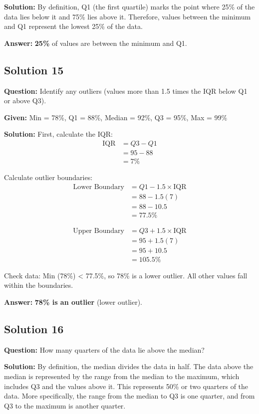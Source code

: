 \documentclass[12pt,a4paper]{article}
\begin{document}
\textbf{Solution:} By definition, Q1 (the first quartile) marks the point where 25\% of the data lies below it and 75\% lies above it. Therefore, values between the minimum and Q1 represent the lowest 25\% of the data.

\textbf{Answer:} \textbf{25\%} of values are between the minimum and Q1.

\subsection*{Solution 15}
\textbf{Question:} Identify any outliers (values more than 1.5 times the IQR below Q1 or above Q3).

\textbf{Given:} Min = 78\%, Q1 = 88\%, Median = 92\%, Q3 = 95\%, Max = 99\%

\textbf{Solution:}
First, calculate the IQR:
\begin{align*}
\text{IQR} &= Q3 - Q1 \\
&= 95 - 88 \\
&= 7\%
\end{align*}

Calculate outlier boundaries:
\begin{align*}
\text{Lower Boundary} &= Q1 - 1.5 \times \text{IQR} \\
&= 88 - 1.5(7) \\
&= 88 - 10.5 \\
&= 77.5\%
\end{align*}

\begin{align*}
\text{Upper Boundary} &= Q3 + 1.5 \times \text{IQR} \\
&= 95 + 1.5(7) \\
&= 95 + 10.5 \\
&= 105.5\%
\end{align*}

Check data: Min (78\%) < 77.5\%, so 78\% is a lower outlier. All other values fall within the boundaries.

\textbf{Answer:} \textbf{78\% is an outlier} (lower outlier).

\subsection*{Solution 16}
\textbf{Question:} How many quarters of the data lie above the median?

\textbf{Solution:} By definition, the median divides the data in half. The data above the median is represented by the range from the median to the maximum, which includes Q3 and the values above it. This represents 50\% or two quarters of the data. More specifically, the range from the median to Q3 is one quarter, and from Q3 to the maximum is another quarter.
\end{document}
